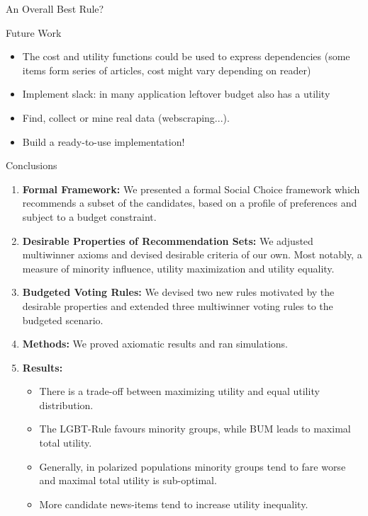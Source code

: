 \documentclass{beamer}
\begin{document}
\begin{frame}{An Overall Best Rule?}
	
\end{frame}

\begin{frame}{Future Work}

\begin{itemize}
	\item The cost and utility functions could be used to express dependencies (some items form series of articles, cost might vary depending on reader)
	\item Implement slack: in many application leftover budget also has a utility
	\item Find, collect or mine real data (webscraping...).
	\item Build a ready-to-use implementation!
	
\end{itemize}
	
\end{frame}

\begin{frame}{Conclusions}

\begin{enumerate}
	\item \textbf{Formal Framework:} We presented a formal Social Choice framework which recommends a subset of the candidates, based on a profile of preferences and subject to a budget constraint.
	\item \textbf{Desirable Properties of Recommendation Sets:} We adjusted multiwinner axioms and devised desirable criteria of our own. Most notably, a measure of minority influence, utility maximization and utility equality.
	\item \textbf{Budgeted Voting Rules:} We devised two new rules motivated by the desirable properties and extended three multiwinner voting rules to the budgeted scenario.
	\item \textbf{Methods:} We proved axiomatic results and ran simulations.
	\item \textbf{Results:}
\begin{itemize}
\item There is a trade-off between maximizing utility and equal utility distribution.
\item The LGBT-Rule favours minority groups, while BUM leads to maximal total utility.
\item Generally, in polarized populations minority groups tend to fare worse and maximal total utility is sub-optimal.
\item More candidate news-items tend to increase utility inequality.
\end{itemize}
\end{enumerate}

\end{frame}

%
%


%
\end{document}
